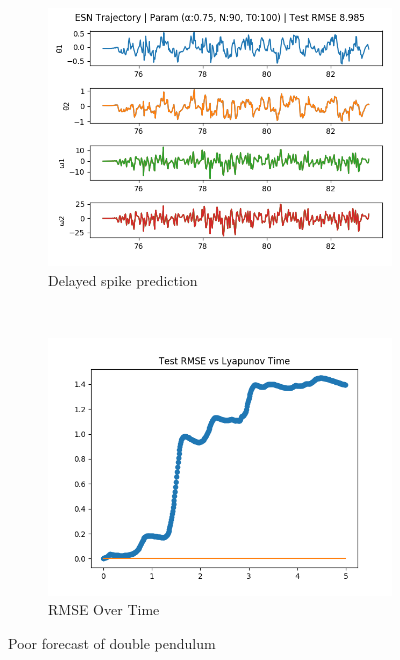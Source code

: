 \documentclass{article}
\begin{document}
\begin{figure}[H]
    \centering
    \begin{subfigure}[b]{0.45\textwidth}
        \includegraphics[width=\textwidth]{doc/paper/images/doub_pend/rank_4_param_127_fit.png}
        \caption{Delayed spike prediction}
    \end{subfigure}
    ~
    \begin{subfigure}[b]{0.45\textwidth}
        \includegraphics[width=\textwidth]{doc/paper/images/lorenz/rank_4_param_300_rmse.png}
        \caption{RMSE Over Time}
    \end{subfigure}
    \caption{Poor forecast of double pendulum}
\end{figure}
\end{document}
